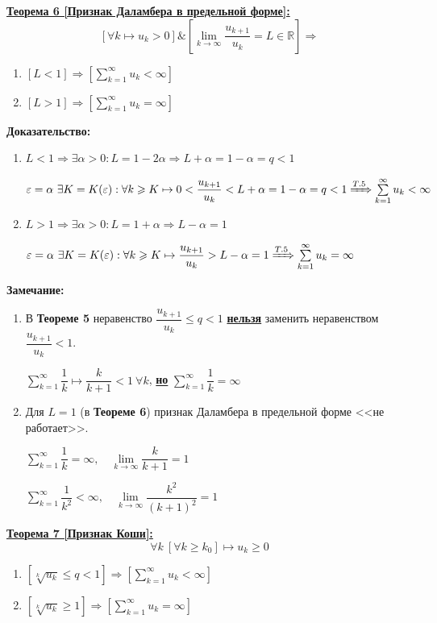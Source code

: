 \documentclass[a4paper,12pt]{article} %
\newcommand{\R}{\mathbb{R}}
\newcommand{\series}{\sum\limits_{k=1}^{\infty}}
\newcommand{\useriesl}{\sum\limits_{k=1}^{\infty} u_k < \infty}
\newcommand{\useriese}{\sum\limits_{k=1}^{\infty} u_k = \infty}
\begin{document}
\underline{\textbf{Теорема 6 [Признак Даламбера в предельной форме]:}}
$$\left[ \forall k \mapsto u_k > 0 \right] \& \left[ \lim\limits_{k \to \infty} \dfrac{u_{k+1}}{u_k} = L \in \R \right] \Rightarrow$$
\begin{enumerate}
	\item $\left[ L < 1 \right] \Rightarrow \left[ \useriesl \right]$
	\item $\left[ L > 1 \right] \Rightarrow \left[ \useriese \right]$
\end{enumerate}
\textbf{Доказательство:}
\begin{enumerate}
	\item $L < 1 \Rightarrow \exists \alpha > 0: L = 1 - 2\alpha \Rightarrow L + \alpha = 1 - \alpha = q < 1$
	
	$\varepsilon = \alpha \ \exists K = K(\varepsilon): \forall k \geqslant K \mapsto 0 < \dfrac{u_{k+1}}{u_k} < L + \alpha = 1 - \alpha = q < 1 \xRightarrow[]{T.5} \useriesl$
	\item $L > 1 \Rightarrow \exists \alpha > 0: L = 1 + \alpha \Rightarrow L - \alpha = 1$
	
	$\varepsilon = \alpha \ \exists K = K(\varepsilon): \forall k \geqslant K \mapsto \dfrac{u_{k+1}}{u_k} > L - \alpha = 1 \xRightarrow[]{T.5} \useriese$
\end{enumerate}
\textbf{Замечание:}
\begin{enumerate}
	\item В \textbf{Теореме 5} неравенство $\dfrac{u_{k+1}}{u_k} \leqslant q < 1$ \underline{\textbf{нельзя}} заменить неравенством $\dfrac{u_{k+1}}{u_k} < 1$.
	
	$\series \dfrac{1}{k} \mapsto \dfrac{k}{k+1} < 1 \ \forall k$, \underline{\textbf{но}} $\series \dfrac{1}{k} = \infty$
	\item Для $L = 1$ (в \textbf{Теореме 6}) признак Даламбера в предельной форме <<не работает>>.
	
	$\series \dfrac{1}{k} = \infty, \hspace{1em} \lim\limits_{k \to \infty} \dfrac{k}{k+1} = 1$
	
	$\series \dfrac{1}{k^2} < \infty, \hspace{1em} \lim\limits_{k \to \infty} \dfrac{k^2}{(k+1)^2} = 1$
\end{enumerate}
\underline{\textbf{Теорема 7 [Признак Коши]:}}
$$\forall k \ [\forall k \geqslant k_0] \mapsto u_k \geqslant 0$$
\begin{enumerate}
	\item $ \left[ \sqrt[k]{u_k} \leqslant q < 1 \right] \Rightarrow \left[ \useriesl \right]$
	\item $ \left[ \sqrt[k]{u_k} \geqslant 1 \right] \Rightarrow \left[ \useriese \right]$
\end{enumerate}
\end{document}
